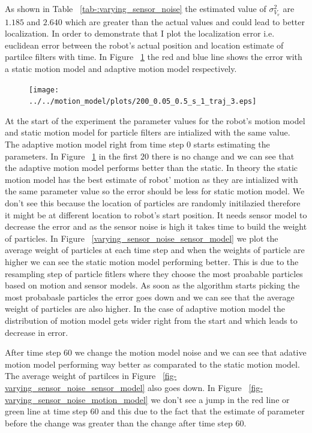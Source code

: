 \documentclass[12pt,draft]{dalcsthesis}
\begin{document}
As shown in Table ~\ref{tab-:varying_sensor_noise} the estimated value of $\sigma_{V_{v}}^2$ are $1.185$ and $2.640$ which are greater than the actual values and could lead to better localization. In order to demonstrate that I plot the localization error i.e. euclidean error between the robot's actual position and location estimate of partilce filters with time. In Figure ~\ref{fig-varying_sensor_noise} the red and blue line shows the error with a static motion model and adaptive motion model respectively.

 
 
\begin{figure}
  \centering
     {\texttt{[image: ../../motion\_model/plots/200\_0.05\_0.5\_s\_1\_traj\_3.eps]}}
  \caption{\label{fig-varying_sensor_noise} }
\end{figure}
At the start of the experiment the parameter values for the robot's motion model and static motion model for particle filters are intialized with the same value. The adaptive motion model right from time step 0 starts estimating the parameters. In Figure ~\ref{fig-varying_sensor_noise} in the first $20$ there is no change and we can see that the adaptive motion model performs better than the static. In theory the static motion model has the best estimate of robot' motion as they are intialized with the same parameter value so the error should be less for static motion model. We don't see this because the location of particles are randomly initilazied therefore it might be at different location to robot's start position. It needs sensor model to decrease the error and as the sensor noise is high it takes time to build the weight of particles. In Figure ~\ref{varying_sensor_noise_sensor_model} we plot the average weight of particles at each time step and when the weights of particle are higher we can see the static motion model performing better. This is due to the resampling step of particle fitlers where they choose the most proabable particles based on motion and sensor models. As soon as the algorithm starts picking the most probabasle particles the error goes down and we can see that the average weight of particles are also higher. In the case of adaptive motion model the distribution of motion model gets wider right from the start and which leads to decrease in error.

After time step 60 we change the motion model noise and we can see that adative motion model performing way better as comparated to the static motion model. The average weight of partilces in Figure ~\ref{fig-varying_sensor_noise_sensor_model} also goes down. In Figure ~\ref{fig-varying_sensor_noise_motion_model} we don't see a jump in the red line or green line at time step 60 and this due to the fact that the estimate of parameter before the change was greater than the change after time step 60. 
\end{document}

